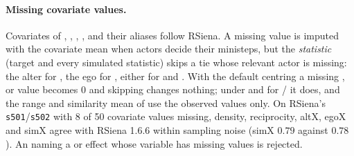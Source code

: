 \paragraph{Missing covariate values.} Covariates of , , , ,  and their aliases follow RSiena. A missing value is imputed with the covariate mean when actors decide their ministeps, but the \emph{statistic} (target and every simulated statistic) skips a tie whose relevant actor is missing: the alter for , the ego for , either for  and . With the default centring a missing ,  or  value becomes 0 and skipping changes nothing; under  and for / it does, and the range and similarity mean of  use the observed values only. On RSiena's \texttt{s501}/\texttt{s502} with 8 of 50 covariate values missing, density, reciprocity, altX, egoX and simX agree with RSiena 1.6.6 within sampling noise (simX $0.79$ against $0.78$). An  naming a  or  effect whose variable has missing values is rejected.

